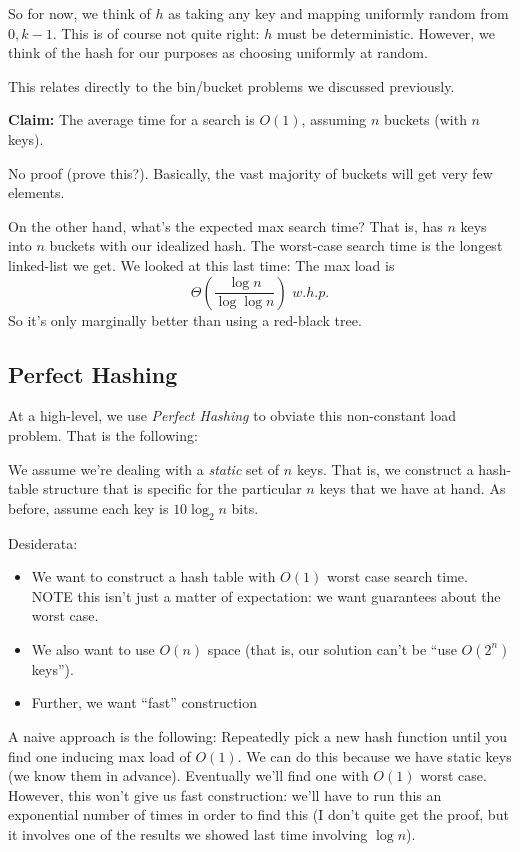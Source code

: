 \documentclass{article}
\begin{document}
So for now, we think of $h$ as taking any key and mapping uniformly
random from $0,k-1$.
This is of course not quite right: $h$ must be deterministic.
However, we think of the hash for our purposes as choosing uniformly
at random.

This relates directly to the bin/bucket problems we discussed previously.

\textbf{Claim:}
The average time for a search is $O(1)$, assuming $n$ buckets (with $n$ keys).

No proof (prove this?).
 Basically, the vast majority of buckets will get very few elements.

On the other hand, what's the expected max search time?
That is, has $n$ keys into $n$ buckets with our idealized hash.
The worst-case search time is the longest linked-list we get.
We looked at this last time:
The max load is
$$
\Theta\left(
	\frac{\log n} {\log\log n}
\right)
\,\, w.h.p.
$$
So it's only marginally better than using a red-black tree.

\subsection{Perfect Hashing}

At a high-level, we use \textit{Perfect Hashing} to obviate this
non-constant load problem.
That is the following:

We assume we're dealing with a \textit{static} set of $n$ keys.
That is, we construct a hash-table structure that is specific for the
particular $n$ keys that we have at hand.
As before, assume each key is $10\log_2 n$ bits.

Desiderata:

\begin{itemize}

\item
We want to construct a hash table with $O(1)$ worst case search time.
NOTE this isn't just a matter of expectation: we want guarantees about
the worst case.

\item
We also want to use $O(n)$ space (that is, our solution can't be ``use $O(2^n)$ keys'').

\item
Further, we want ``fast'' construction
\end{itemize}

A naive approach is the following: Repeatedly pick a new hash function
until you find one inducing max load of $O(1)$.
We can do this because we have static keys (we know them in advance).
Eventually we'll find one with $O(1)$ worst case.
However, this won't give us fast construction:
we'll have to run this an exponential number of times in order to 
find this (I don't quite get the proof, but it involves one of the
results we showed last time involving $\log n$).
\end{document}
